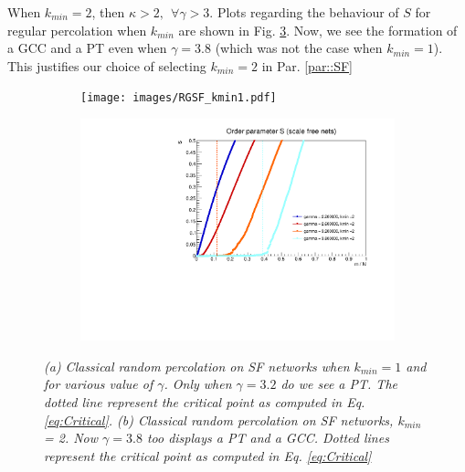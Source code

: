 When $k_{min} = 2$, then $\kappa > 2, \>\> \forall \gamma > 3$. Plots regarding the behaviour of $S$ for regular percolation when $k_{min}$ are shown in Fig. \ref{fig::RGSF2}. Now, we see the formation of a GCC and a PT even when $\gamma = 3.8$ (which was not the case when $k_{min} = 1$). This justifies our choice of selecting $k_{min} = 2$ in Par. \ref{par::SF}

\begin{figure}
	\centering
	\begin{subfigure}[t]{0.8\linewidth}
		\texttt{[image: images/RGSF\_kmin1.pdf]}
		\vspace{-28pt}
		
		\caption{}
		\label{fig::RGSF1}
	\end{subfigure}
	\hspace{3pt}
	\begin{subfigure}[t]{0.8\linewidth}
		\includegraphics[width=\linewidth]{images/RGSF_kmin2.pdf}
		\vspace{-28pt}
		\caption{} 
		\label{fig::RGSF2}
	\end{subfigure}
	\vspace{-10pt}
	\caption{\textit{(a) Classical random percolation on SF networks when $k_{min} = 1$ and for various value of $\gamma$. Only when $\gamma = 3.2$ do we see a PT. The dotted line represent the critical point as computed in Eq. \ref{eq:Critical}. (b) Classical random percolation on SF networks, $k_{min}$ = 2. Now $\gamma = 3.8$ too displays a PT and a GCC. Dotted lines represent the critical point as computed in Eq. \ref{eq:Critical}}}
\end{figure}


\newpage